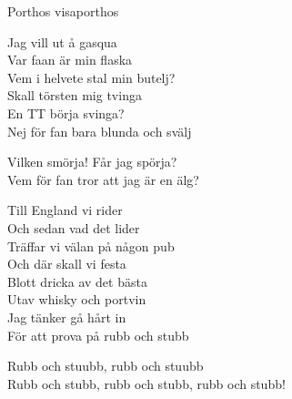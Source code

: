 \begin{song}{Porthos visa}{porthos}
\begin{vers}
Jag vill ut å gasqua\\
Var faan är min flaska\\
Vem i helvete stal min butelj?\\
Skall törsten mig tvinga\\
En TT börja svinga?\\
Nej för fan bara blunda och svälj\\
\end{vers}
\begin{vers}
Vilken smörja! Får jag spörja?\\
Vem för fan tror att jag är en älg?\\
\end{vers}
\begin{vers}
Till England vi rider\\
Och sedan vad det lider\\
Träffar vi välan på någon pub\\
Och där skall vi festa\\
Blott dricka av det bästa\\
Utav whisky och portvin\\
Jag tänker gå hårt in\\
För att prova på rubb och stubb\\
\end{vers}
\begin{vers}
Rubb och stuubb, rubb och stuubb\\
Rubb och stubb, rubb och stubb, rubb och stubb!\\
\end{vers}
\end{song}
